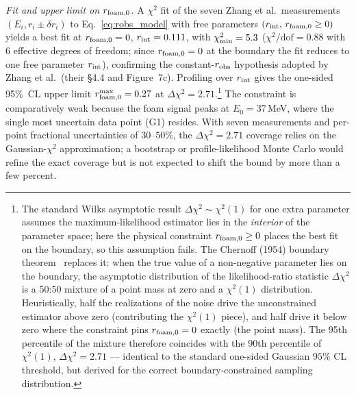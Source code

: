 \documentclass[aps,prd,onecolumn,amsmath,amssymb]{revtex4-2}
\begin{document}
\textit{Fit and upper limit on $r_{\rm foam,0}$.}
A $\chi^2$ fit of the seven Zhang et al.\ measurements
$(E_i, r_i\pm\delta r_i)$ to Eq.~\eqref{eq:robs_model} with free
parameters $(r_{\rm int},\,r_{\rm foam,0}\geq 0)$ yields a best
fit at $r_{\rm foam,0}=0$, $r_{\rm int}=0.111$, with
$\chi^2_{\rm min}=5.3$ ($\chi^2/\mathrm{dof}=0.88$ with 6 effective
degrees of freedom; since $r_{\rm foam,0}=0$ at the boundary the fit
reduces to one free parameter $r_{\rm int}$), confirming the
constant-$r_{\rm obs}$ hypothesis adopted by Zhang et al.\ (their
\S4.4 and Figure~7c).  Profiling over $r_{\rm int}$ gives the one-sided
95\%~CL upper limit $r_{\rm foam,0}^{\rm max} = 0.27$ at
$\Delta\chi^2 = 2.71$.\footnote{The standard Wilks asymptotic result
$\Delta\chi^2\sim\chi^2(1)$ for one extra parameter assumes the
maximum-likelihood estimator lies in the \emph{interior} of the
parameter space; here the physical constraint $r_{\rm foam,0}\geq 0$
places the best fit on the boundary, so this assumption fails.  The
Chernoff (1954) boundary theorem~\cite{Chernoff1954} replaces it: when
the true value of a non-negative parameter lies on the boundary, the
asymptotic distribution of the likelihood-ratio statistic
$\Delta\chi^2$ is a 50:50 mixture of a point mass at zero and a
$\chi^2(1)$ distribution.  Heuristically, half the realizations of the
noise drive the unconstrained estimator above zero (contributing the
$\chi^2(1)$ piece), and half drive it below zero where the constraint
pins $r_{\rm foam,0}=0$ exactly (the point mass).  The 95th percentile
of the mixture therefore coincides with the 90th percentile of
$\chi^2(1)$, $\Delta\chi^2=2.71$ --- identical to the standard
one-sided Gaussian $95\%$ CL threshold, but derived for the correct
boundary-constrained sampling distribution.}  The constraint is comparatively weak
because the foam signal peaks at $E_0 = 37$\,MeV, where the single
most uncertain data point (G1) resides.  With seven measurements and
per-point fractional uncertainties of $30$--$50\%$, the
$\Delta\chi^2=2.71$ coverage relies on the Gaussian-$\chi^2$
approximation; a bootstrap or profile-likelihood Monte Carlo would
refine the exact coverage but is not expected to shift the bound by
more than a few percent.
\end{document}
